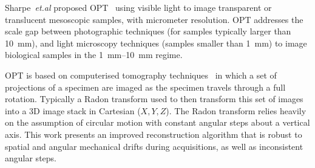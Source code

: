 \documentclass{osa-article}
\begin{document}


Sharpe~\emph{et.al} proposed \gls{OPT}~\cite{sharpeOpticalProjectionTomography2002}
using visible light to image transparent or translucent mesoscopic samples, with micrometer resolution.
\gls{OPT} addresses the scale gap between photographic techniques (for samples typically larger than \SI{10}{\milli\meter}), and light microscopy techniques (samples smaller than \SI{1}{\milli\meter}) to image biological samples in the \SIrange{1}{10}{\milli\meter} regime.


\gls{OPT} is based on computerised tomography techniques~\cite{kakPrinciplesComputerizedTomographic2001} in which a set of projections of a specimen are imaged as the specimen travels through a full rotation.
Typically a Radon transform used to then transform this set of images into a 3D image stack in Cartesian (\(X,Y,Z\)).
The \gls{Radon transform} relies heavily on the assumption of circular motion with constant angular steps about a vertical axis.
This work presents an improved reconstruction algorithm that is robust to spatial and angular mechanical drifts during acquisitions, as well as inconsistent angular steps.
\end{document}
